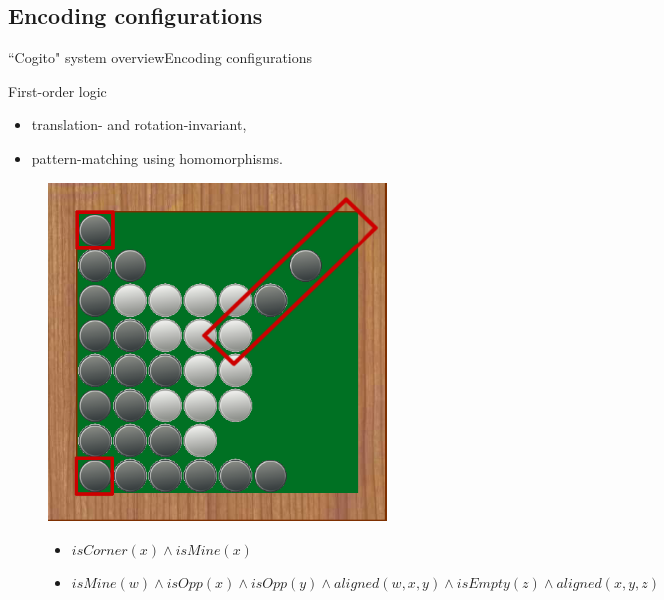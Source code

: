\subsection{Encoding configurations}

\begin{frame}{``Cogito" system overview}{Encoding configurations}

\begin{block}{First-order logic}
  \begin{itemize}
    \item translation- and rotation-invariant,
    \item pattern-matching using homomorphisms.
  \end{itemize}
\end{block}
\pause

\begin{figure}[ht]
  \begin{minipage}[t]{0.4\linewidth}
    \vspace{0pt}
    \centering
    \includegraphics[width=0.8\textwidth]{img/cogito/raisonneur_choix_2}	
  \end{minipage}
  \hfill
  \begin{minipage}[t]{0.55\textwidth}
    \vspace{0pt}
    \begin{itemize}
	\item $isCorner(x) \wedge isMine(x)$
	\item $isMine(w) \wedge isOpp(x) \wedge isOpp(y) 
		  \wedge aligned(w,x,y) \wedge isEmpty(z) 
		  \wedge aligned (x,y,z)$
    \end{itemize}
  \end{minipage}
\end{figure}

\end{frame}

